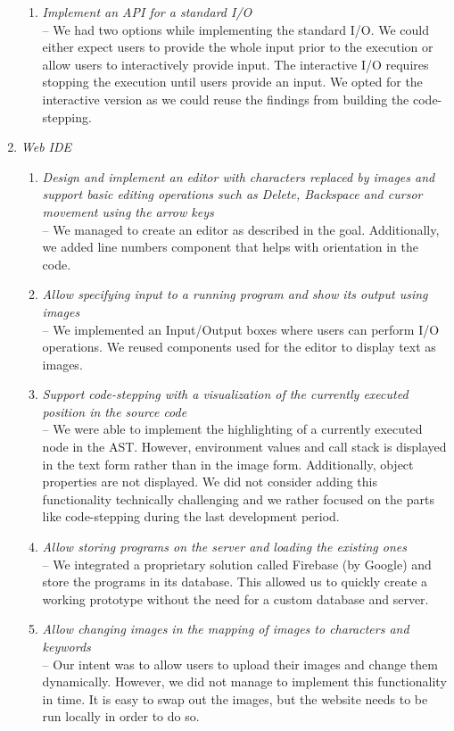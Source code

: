 \begin{enumerate}
\begin{enumerate}[label=(\alph*)]
	 \item \textit{Implement an API for a standard I/O} \\
     -- We had two options while implementing the standard I/O. We could either expect users to provide the whole input prior to the execution or allow users
     to interactively provide input. The interactive I/O requires stopping the execution until users provide an input. We opted for the interactive version as we
     could reuse the findings from building the code-stepping.
   \end{enumerate}
\item \textit{Web IDE}
   \begin{enumerate}[label=(\alph*)]
     \item \textit{Design and implement an editor with characters replaced by images and support basic editing operations such as Delete,
     Backspace and cursor movement using the arrow keys} \\
     -- We managed to create an editor as described in the goal. Additionally, we added line numbers component that helps with orientation in the code.
	 \item \textit{Allow specifying input to a running program and show its output using images} \\
     -- We implemented an Input/Output boxes where users can perform I/O operations. We reused components used for the editor to display text as
     images.
	 \item \textit{Support code-stepping with a visualization of the currently executed position in the source code} \\
     -- We were able to implement the highlighting of a currently executed node in the AST. However, environment values and call stack
     is displayed in the text form rather than in the image form. Additionally, object properties are not displayed. We did not consider adding this functionality
     technically challenging and we rather focused on the parts like code-stepping during the last development period.
	 \item \textit{Allow storing programs on the server and loading the existing ones} \\
     -- We integrated a proprietary solution called Firebase \cite{Firebase} (by Google) and store the programs in its database. This allowed us to quickly create
     a working prototype without the need for a custom database and server.
	 \item \textit{Allow changing images in the mapping of images to characters and keywords} \\
     -- Our intent was to allow users to upload their images and change them dynamically. However, we did not manage to implement this functionality
     in time. It is easy to swap out the images, but the website needs to be run locally in order to do so.
   \end{enumerate}
\end{enumerate}

